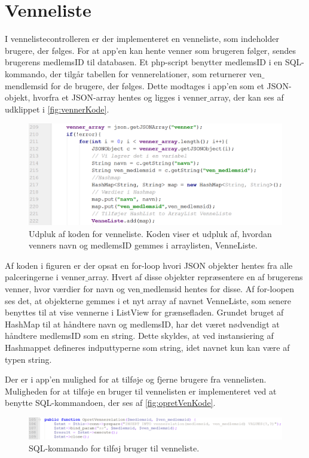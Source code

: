 \section{Venneliste}
I vennelistecontrolleren er der implementeret en venneliste, som indeholder brugere, der følges. For at app'en kan hente venner som brugeren følger, sendes brugerens medlemsID til databasen. Et php-script benytter medlemsID i en SQL-kommando, der tilgår tabellen for vennerelationer, som returnerer ven$\_$mendlemsid for de brugere, der følges. 
Dette modtages i app'en som et JSON-objekt, hvorfra et JSON-array hentes og ligges i venner$\_$array, der kan ses af udklippet i \autoref{fig:vennerKode}.  

\begin{figure} [H]
\centering
\includegraphics[width=1\textwidth]{figures/imple/vennerKode}
\caption{Udpluk af koden for venneliste. Koden viser et udpluk af, hvordan venners navn og medlemsID gemmes i arraylisten, VenneListe.}
\label{fig:vennerKode}
\end{figure} 

Af koden i figuren er der opsat en for-loop hvori JSON objekter hentes fra alle palceringerne i venner$\_$array. Hvert af disse objekter repræsentere en af brugerens venner, hvor værdier for navn og ven$\_$medlemsid hentes for disse. 
Af for-loopen ses det, at objekterne gemmes i et nyt array af navnet VenneListe, som senere benyttes til at vise vennerne i ListView for grænsefladen. Grundet bruget af HashMap til at håndtere navn og medlemsID, har det været nødvendigt at håndtere medlemsID som en string. Dette skyldes, at ved instansiering af Hashmappet defineres indputtyperne som string, idet navnet kun kan være af typen string. 

Der er i app'en mulighed for at tilføje og fjerne brugere fra vennelisten. Muligheden for at tilføje en bruger til vennelisten er implementeret ved at benytte SQL-kommandoen, der ses af \autoref{fig:opretVenKode}.

\begin{figure} [H]
\centering
\includegraphics[width=1\textwidth]{figures/imple/opretVenKode}
\caption{SQL-kommando for tilføj bruger til venneliste.}
\label{fig:opretVenKode}
\end{figure}

